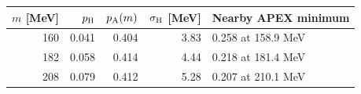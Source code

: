 \begin{tabular}{rrrrl}
\toprule
$m$ [MeV] & $p_{\rm H}$ & $p_{\rm A}(m)$ & $\sigma_{\rm H}$ [MeV] & Nearby APEX minimum \\
\midrule
160 & 0.041 & 0.404 & 3.83 & 0.258 at 158.9 MeV \\
182 & 0.058 & 0.414 & 4.44 & 0.218 at 181.4 MeV \\
208 & 0.079 & 0.412 & 5.28 & 0.207 at 210.1 MeV \\
\bottomrule
\end{tabular}
